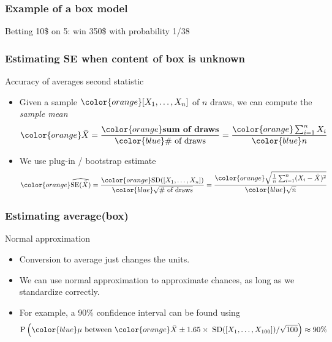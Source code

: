 \documentclass[handout]{beamer}
\begin{document}
   \begin{frame}
   \frametitle{Example of a box model}
   \begin{center}
   \end{center}
   Betting 10\$ on {\color{red} 5}: win 350\$ with probability 1/38
   \end{frame}


   \begin{frame} \frametitle{Estimating SE when content of box is unknown}

   \begin{block}
   {Accuracy of averages second statistic}
   \begin{itemize}
   \item Given a sample ${\color{orange}[X_1, \dots, X_n]}$ of $n$ draws, we can compute the {\em sample mean}
   $$
   {\color{orange} \bar{X}}  = \frac{{\color{orange} \text{\bf sum of draws}}}{{\color{blue} \text{$\#$ of draws}}}  = \frac{{\color{orange} \sum_{i=1}^n X_i}}{{\color{blue} n}}
   $$
   \item We use {\color{orange} plug-in / bootstrap} estimate
   $$
   {\color{orange}\widehat{ \text{SE}(\bar{X})}} = \frac{{\color{orange}\text{SD($[X_1, \dots, X_n]$)}}}{{\color{blue}\sqrt{ \text{$\#$ of draws}}}} =  \frac{{\color{orange} \sqrt{\frac{1}{n}\sum_{i=1}^n (X_i - \bar{X})^2}}}{\color{blue} \sqrt{n}}
   $$

   \end{itemize}
   \end{block}
   \end{frame}


   \begin{frame} \frametitle{Estimating {\color{blue} average({\bf box})}}

   \begin{block}
   {Normal approximation}
   \begin{itemize}
   \item Conversion to average just changes the units.
   \item We can use normal approximation to approximate chances,
   as long as we standardize correctly.
   \item For example, a 90\% confidence interval can be found using
   $$
   \begin{aligned}
   \text{P} \left(\text{${\color{blue} \mu}$ between ${\color{orange} \bar{X} \pm 1.65 \times \; \text{SD}([X_1, \dots, X_{100}]) / \sqrt{100}}$}\right) &\approx 90\% \\
   \end{aligned}
   $$

   \end{itemize}
   \end{block}
   \end{frame}
\end{document}
